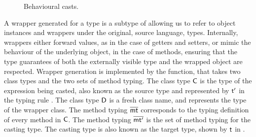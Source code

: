 \documentclass[acmlarge, anonymous, authordraft]{acmart}
\begin{document}
\begin{figure}[!ht]
\vspace{-2mm}

{  \small
  \begin{mathpar}

\end{mathpar}}  

\vspace{-2mm}
\caption{Behavioural casts.}\label{behave}
\end{figure}

A wrapper generated for a type \C is a subtype of \C allowing us to refer to
object instances and wrappers under the original, source language,
types. Internally, wrappers either forward values, as in the case of getters
and setters, or mimic the behaviour of the underlying object, in the case of
methods, ensuring that the type guarantees of both the externally visible
type and the wrapped object are respected.
Wrapper generation is implemented by the  function, that takes two class types and the two
sets of method typing. The class type $\C$ is the type of the expression being casted, also known 
as the source type and represented by $\tp$ in the typing rule .
The class type $\D$ is a fresh class name, and represents the type of the wrapper class.
The method typing $\bmt$ corresponds to the typing definition of every method in $\C$.
The method typing $\bmtp$ is the set of method typing for the casting type. The casting
type is also known as the target type, shown by $\t$ in .

% 
\end{document}
